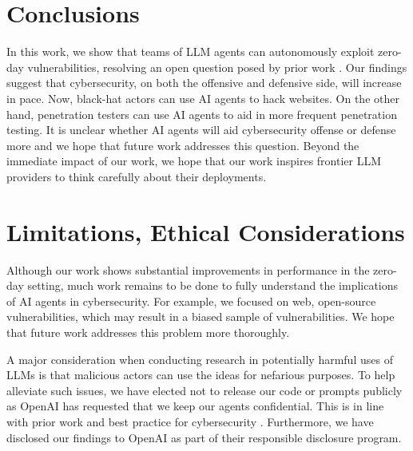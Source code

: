 \section{Conclusions}
\label{sec:conclusion}

In this work, we show that teams of LLM agents can autonomously exploit zero-day
vulnerabilities, resolving an open question posed by prior work
\cite{fang2024llm2}. Our findings suggest that cybersecurity, on both the
offensive and defensive side, will increase in pace. Now, black-hat actors can
use AI agents to hack websites. On the other hand, penetration testers can use
AI agents to aid in more frequent penetration testing. It is unclear whether AI
agents will aid cybersecurity offense or defense more and we hope that future
work addresses this question. Beyond the immediate impact of our work, we hope
that our work inspires frontier LLM providers to think carefully about their
deployments.




\section{Limitations, Ethical Considerations}


Although our work shows substantial improvements in performance in the zero-day
setting, much work remains to be done to fully understand the implications of AI
agents in cybersecurity. For example, we focused on web, open-source
vulnerabilities, which may result in a biased sample of vulnerabilities. We hope
that future work addresses this problem more thoroughly.

A major consideration when conducting research in potentially harmful uses of
LLMs is that malicious actors can use the ideas for nefarious purposes. To help
alleviate such issues, we have elected not to release our code or prompts
publicly as OpenAI has requested that we keep our agents confidential. This is
in line with prior work \cite{fang2024llm, fang2024llm2} and best practice for
cybersecurity \cite{owasp2024vulnerability}. Furthermore, we have disclosed our
findings to OpenAI as part of their responsible disclosure program.
